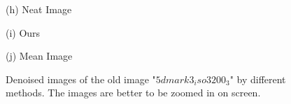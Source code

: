\documentclass[10pt,twocolumn,letterpaper]{article}
\begin{document}
\begin{figure}
{\begin{minipage}[t]{0.2\textwidth}
{\footnotesize (h) Neat Image}
\end{minipage}
\begin{minipage}[t]{0.2\textwidth}
\centering
{}
{\footnotesize (i) Ours }
\end{minipage}
\begin{minipage}[t]{0.2\textwidth}
\centering
{}
{\footnotesize (j) Mean Image }
\end{minipage}
}
\caption{Denoised images of the old image "$5dmark3_iso3200_3$" by different methods. The images are better to be zoomed in on screen.}
\label{fig2}
\end{figure}
\end{document}
